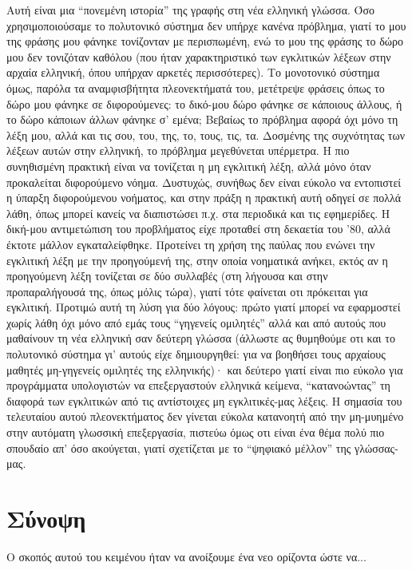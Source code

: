 \documentclass[11pt]{article}
\begin{document}
Αυτή είναι μια “πονεμένη ιστορία” της γραφής στη νέα ελληνική γλώσσα. Όσο χρησιμοποιούσαμε το πολυτονικό σύστημα δεν υπήρχε κανένα πρόβλημα, γιατί το μου της φράσης μου φάνηκε τονίζονταν με περισπωμένη, ενώ το μου της φράσης το δώρο μου δεν τονιζόταν καθόλου (που ήταν χαρακτηριστικό των εγκλιτικών λέξεων στην αρχαία ελληνική, όπου υπήρχαν αρκετές περισσότερες). Το μονοτονικό σύστημα όμως, παρόλα τα αναμφισβήτητα πλεονεκτήματά του, μετέτρεψε φράσεις όπως το δώρο μου φάνηκε σε διφορούμενες: το δικό-μου δώρο φάνηκε σε κάποιους άλλους, ή το δώρο κάποιων άλλων φάνηκε σ’ εμένα; Βεβαίως το πρόβλημα αφορά όχι μόνο τη λέξη μου, αλλά και τις σου, του, της, το, τους, τις, τα. Δοσμένης της συχνότητας των λέξεων αυτών στην ελληνική, το πρόβλημα μεγεθύνεται υπέρμετρα. Η πιο συνηθισμένη πρακτική είναι να τονίζεται η μη εγκλιτική λέξη, αλλά μόνο όταν προκαλείται διφορούμενο νόημα. Δυστυχώς, συνήθως δεν είναι εύκολο να εντοπιστεί η ύπαρξη διφορούμενου νοήματος, και στην πράξη η πρακτική αυτή οδηγεί σε πολλά λάθη, όπως μπορεί κανείς να διαπιστώσει π.χ. στα περιοδικά και τις εφημερίδες. Η δική-μου αντιμετώπιση του προβλήματος είχε προταθεί στη δεκαετία του ’80, αλλά έκτοτε μάλλον εγκαταλείφθηκε. Προτείνει τη χρήση της παύλας που ενώνει την εγκλιτική λέξη με την προηγούμενή της, στην οποία νοηματικά ανήκει, εκτός αν η προηγούμενη λέξη τονίζεται σε δύο συλλαβές (στη λήγουσα και στην προπαραλήγουσά της, όπως μόλις τώρα), γιατί τότε φαίνεται οτι πρόκειται για εγκλιτική. Προτιμώ αυτή τη λύση για δύο λόγους: πρώτο γιατί μπορεί να εφαρμοστεί χωρίς λάθη όχι μόνο από εμάς τους “γηγενείς ομιλητές” αλλά και από αυτούς που μαθαίνουν τη νέα ελληνική σαν δεύτερη γλώσσα (άλλωστε ας θυμηθούμε οτι και το πολυτονικό σύστημα γι’ αυτούς είχε δημιουργηθεί: για να βοηθήσει τους αρχαίους μαθητές μη-γηγενείς ομιλητές της ελληνικής)· και δεύτερο γιατί είναι πιο εύκολο για προγράμματα υπολογιστών να επεξεργαστούν ελληνικά κείμενα, “κατανοώντας” τη διαφορά των εγκλιτικών από τις αντίστοιχες μη εγκλιτικές-μας λέξεις. Η σημασία του τελευταίου αυτού πλεονεκτήματος δεν γίνεται εύκολα κατανοητή από την μη-μυημένο στην αυτόματη γλωσσική επεξεργασία, πιστεύω όμως οτι είναι ένα θέμα πολύ πιο σπουδαίο απ’ όσο ακούγεται, γιατί σχετίζεται με το “ψηφιακό μέλλον” της γλώσσας-μας.
\section{Σύνοψη}

Ο σκοπός αυτού του κειμένου ήταν να ανοίξουμε ένα νεο ορίζοντα ώστε να...
\end{document}
